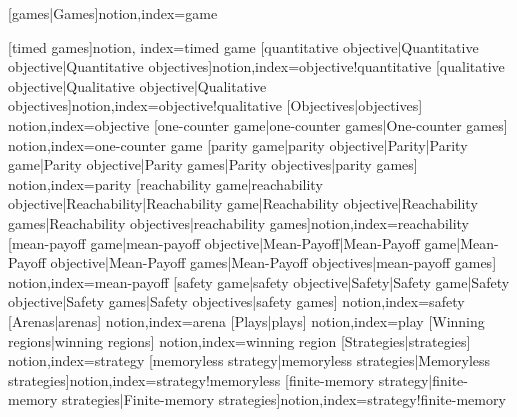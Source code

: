 [games|Games]{notion,index={game}}

[timed games]{notion, index={timed game}}
 [quantitative objective|Quantitative
objective|Quantitative objectives]{notion,index={objective!quantitative}}
 [qualitative objective|Qualitative
objective|Qualitative
objectives]{notion,index={objective!qualitative}}
[Objectives|objectives]
{notion,index={objective}}
 [one-counter game|one-counter
games|One-counter games] {notion,index={one-counter game}}
[parity game|parity objective|Parity|Parity
game|Parity objective|Parity games|Parity objectives|parity games]
{notion,index={parity}}
[reachability game|reachability
objective|Reachability|Reachability game|Reachability
objective|Reachability games|Reachability objectives|reachability
games]{notion,index={reachability}}
[mean-payoff game|mean-payoff
objective|Mean-Payoff|Mean-Payoff game|Mean-Payoff
objective|Mean-Payoff games|Mean-Payoff objectives|mean-payoff games]
{notion,index={mean-payoff}}
[safety game|safety
objective|Safety|Safety game|Safety
objective|Safety games|Safety objectives|safety games]
{notion,index={safety}}
[Arenas|arenas]
{notion,index={arena}}
[Plays|plays]
{notion,index={play}}
[Winning regions|winning regions]
{notion,index={winning region}}
[Strategies|strategies]
{notion,index={strategy}}
[memoryless strategy|memoryless
  strategies|Memoryless
  strategies]{notion,index={strategy!memoryless}}
[finite-memory strategy|finite-memory
  strategies|Finite-memory
  strategies]{notion,index={strategy!finite-memory}}
